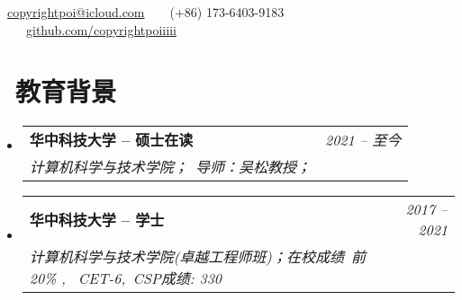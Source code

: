 \documentclass[utf8,letterpaper,11pt]{ctexart}
\makeatletter
\newcommand{\resumeSubheading}[4]{
  \vspace{-1pt}\item
    \begin{tabular*}{0.97\textwidth}[t]{l@{\extracolsep{\fill}}r}
      \textbf{#1} & \textit{#2} \\
      \textit{\small#3} & \textit{\small #4} \\
    \end{tabular*}\vspace{-5pt}
}
\newcommand{\resumeSubHeadingListStart}{\begin{itemize}[leftmargin=*]}
\newcommand{\resumeSubHeadingListEnd}{\end{itemize}}
\makeatother
\begin{document}




   \faEnvelope\ \href{mailto:copyrightpoi@icloud.com}{copyrightpoi@icloud.com}\ \ \ \faPhone\ (+86) 173-6403-9183 \ \ \ \faGithub\ \href{https://github.com/copyrightpoiiiii}{github.com/copyrightpoiiiii}
\vspace{1pt}
\section{\faGraduationCap \ 教育背景}
  \resumeSubHeadingListStart
    \resumeSubheading
      {华中科技大学 -- 硕士在读}{2021 -- 至今}
      {计算机科学与技术学院；\ 导师：吴松教授； }{}
    \resumeSubheading
      {华中科技大学 -- 学士}{2017 -- 2021}
      {计算机科学与技术学院(卓越工程师班)；\textit{在校成绩}\  前20\% , \ CET-6,\ CSP成绩: 330}{}
  \resumeSubHeadingListEnd 
\vspace{1pt}
\end{document}

